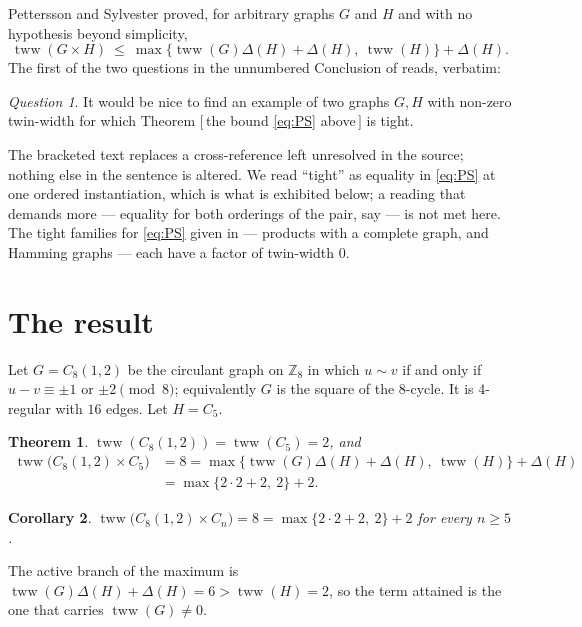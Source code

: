 \documentclass[11pt]{amsart}
\newtheorem{theorem}{Theorem}
\newtheorem{corollary}[theorem]{Corollary}
\theoremstyle{remark}
\newtheorem*{question}{Question}
\DeclareMathOperator{\tww}{tww}
\begin{document}
Pettersson and Sylvester \cite{PS} proved, for arbitrary graphs $G$ and $H$ and
with no hypothesis beyond simplicity,
\begin{equation}\label{eq:PS}
 \tww(G\times H)\ \le\ \max\bigl\{\tww(G)\Delta(H)+\Delta(H),\ \tww(H)\bigr\}
 +\Delta(H).
\end{equation}
The first of the two questions in the unnumbered Conclusion of \cite{PS} reads,
verbatim:
\begin{question}
It would be nice to find an example of two graphs $G,H$ with non-zero
twin-width for which Theorem $[\,$the bound \eqref{eq:PS} above$\,]$ is tight.
\end{question}
\noindent
The bracketed text replaces a cross-reference left unresolved in the source;
nothing else in the sentence is altered. We read ``tight'' as equality in
\eqref{eq:PS} at one ordered instantiation, which is what is exhibited below; a
reading that demands more --- equality for both orderings of the pair, say ---
is not met here. The tight families for \eqref{eq:PS} given in \cite{PS} ---
products with a complete graph, and Hamming graphs --- each have a factor of
twin-width $0$.

\section{The result}

Let $G=C_8(1,2)$ be the circulant graph on $\mathbb Z_8$ in which $u\sim v$
if and only if $u-v\equiv\pm1$ or $\pm2\pmod 8$; equivalently $G$ is the square
of the $8$-cycle. It is $4$-regular with $16$ edges. Let $H=C_5$.

\begin{theorem}\label{thm:main}
$\tww(C_8(1,2))=\tww(C_5)=2$, and
\begin{align*}
 \tww\bigl(C_8(1,2)\times C_5\bigr)
 &=8
 =\max\bigl\{\tww(G)\Delta(H)+\Delta(H),\ \tww(H)\bigr\}+\Delta(H)\\
 &=\max\{2\cdot2+2,\ 2\}+2 .
\end{align*}
\end{theorem}

\begin{corollary}\label{cor:family}
$\tww\bigl(C_8(1,2)\times C_n\bigr)=8=\max\{2\cdot2+2,\ 2\}+2$ for every
$n\ge5$.
\end{corollary}

The active branch of the maximum is $\tww(G)\Delta(H)+\Delta(H)=6>\tww(H)=2$,
so the term attained is the one that carries $\tww(G)\ne0$.
\end{document}
